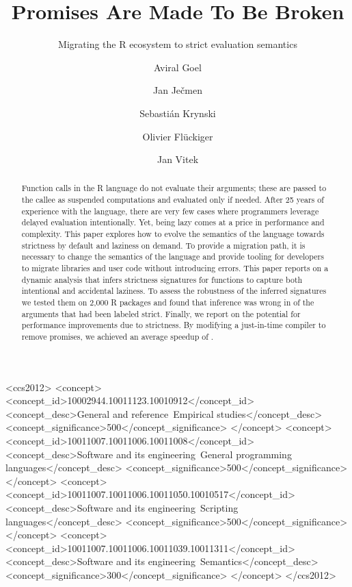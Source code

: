 \documentclass[review,nonacm,screen,acmsmall,anonymous=true]{acmart}
\begin{document}
\title{Promises Are Made To Be Broken}
\subtitle{Migrating the R ecosystem to strict evaluation semantics}

\author{Aviral Goel}
\author{Jan Ječmen}
\author{Sebastián Krynski}
\author{Olivier Flückiger}
\author{Jan Vitek}
\authorsaddresses{}
\renewcommand{\shortauthors}{Goel, et al.}

\begin{abstract}
  Function calls in the R language do not evaluate their arguments; these are
  passed to the callee as suspended computations and evaluated only if needed.
  After 25 years of experience with the language, there are very few cases where
  programmers leverage delayed evaluation intentionally. Yet, being lazy comes
  at a price in performance and complexity. This paper explores how to evolve
  the semantics of the language towards strictness by default and laziness on
  demand. To provide a migration path, it is necessary to change the semantics
  of the language and provide tooling for developers to migrate libraries and
  user code without introducing errors. This paper reports on a dynamic analysis
  that infers strictness signatures for functions to capture both intentional
  and accidental laziness. To assess the robustness of the inferred signatures
  we tested them on 2,000 R packages and found that inference was wrong in
  \robustnesResult of the arguments that had been labeled strict. Finally, we
  report on the potential for performance improvements due to strictness. By
  modifying a just-in-time compiler to remove promises, we achieved an average
  speedup of \speedupRshStrict.
\end{abstract}

\begin{CCSXML}
<ccs2012>
<concept>
<concept_id>10002944.10011123.10010912</concept_id>
<concept_desc>General and reference~Empirical studies</concept_desc>
<concept_significance>500</concept_significance>
</concept>
<concept>
<concept_id>10011007.10011006.10011008</concept_id>
<concept_desc>Software and its engineering~General programming languages</concept_desc>
<concept_significance>500</concept_significance>
</concept>
<concept>
<concept_id>10011007.10011006.10011050.10010517</concept_id>
<concept_desc>Software and its engineering~Scripting languages</concept_desc>
<concept_significance>500</concept_significance>
</concept>
<concept>
<concept_id>10011007.10011006.10011039.10011311</concept_id>
<concept_desc>Software and its engineering~Semantics</concept_desc>
<concept_significance>300</concept_significance>
</concept>
</ccs2012>
\end{CCSXML}
\end{document}

